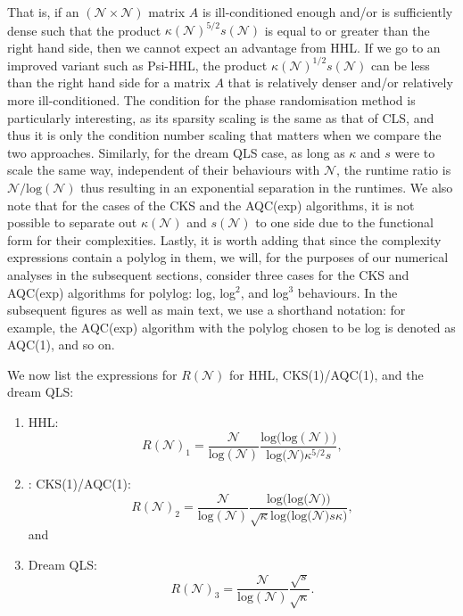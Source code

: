 \documentclass[%
 reprint,
 superscriptaddress,
 amsmath,amssymb,
 aps,
 pra,
floatfix,
nofootinbib,
]{revtex4-2}
\theoremstyle{definition}
\theoremstyle{remark}
\begin{document}
That is, if an $(\mathcal{N} \times \mathcal{N})$ matrix $A$ is ill-conditioned enough and/or is sufficiently dense such that the product $\kappa(\mathcal{N})^{5/2} s(\mathcal{N})$ is equal to or greater than the right hand side, then we cannot expect an advantage from HHL. If we go to an improved variant such as Psi-HHL, the product $\kappa(\mathcal{N})^{1/2} s(\mathcal{N})$ can be less than  the right hand side for a matrix $A$ that is relatively denser and/or relatively more ill-conditioned. The condition for the phase randomisation method is particularly interesting, as its sparsity scaling is the same as that of CLS, and thus it is only the condition number scaling that matters when we compare the two approaches. Similarly, for the dream QLS case, as long as $\kappa$ and $s$ were to scale the same way, independent of their behaviours with $\mathcal{N}$, the runtime ratio is $\mathcal{N}/\mathrm{log}(\mathcal{N})$ thus resulting in an exponential separation in the runtimes. We also note that for the cases of the CKS and the AQC(exp) algorithms, it is not possible to separate out $\kappa(\mathcal{N})$ and $s(\mathcal{N})$ to one side due to the functional form for their complexities. Lastly, it is worth adding that since the complexity expressions contain a polylog in them, we will, for the purposes of our numerical analyses in the subsequent sections, consider three cases for the CKS and AQC(exp) algorithms for polylog: log, log$^2$, and log$^3$ behaviours. In the subsequent figures as well as main text, we use a shorthand notation: for example, the AQC(exp) algorithm with the polylog chosen to be log is denoted as AQC(1), and so on. 

We now list the expressions for $R(\mathcal{N})$ for HHL, CKS(1)/AQC(1), and the dream QLS: 

\begin{enumerate}
    \item HHL: 
    \begin{equation}
        R(\mathcal{N})_{1}=\frac{\mathcal{N}}{\mathrm{log}(\mathcal{N})} \frac{\mathrm{log(log(\mathcal{N})})}{\mathrm{log(}\mathcal{N})\kappa^{5/2}s}, 
        \label{Rhhl}
    \end{equation}
    \item : CKS(1)/AQC(1): 
    \begin{equation}
        R(\mathcal{N})_2=\frac{\mathcal{N}}{\mathrm{log}(\mathcal{N})} \frac{\mathrm{log(log(}\mathcal{N}))}{\sqrt{\kappa} \mathrm{log(log(}\mathcal{N})s\kappa)}, 
        \label{Rcks}
    \end{equation} and 
    \item Dream QLS: 
    \begin{equation}
        R(\mathcal{N})_3=\frac{\mathcal{N}}{\mathrm{log}(\mathcal{N})} \frac{\sqrt{s}}{\sqrt{\kappa}}. 
        \label{Rdqls}
    \end{equation}
\end{enumerate}
\end{document}
